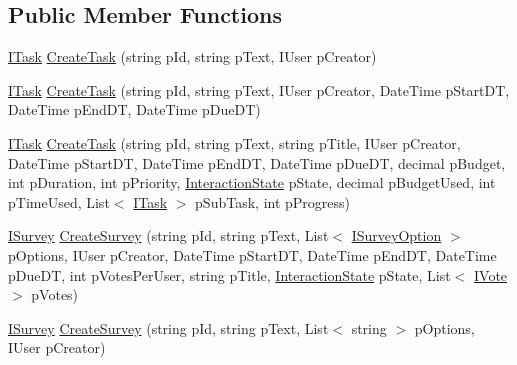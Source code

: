 \subsection*{Public Member Functions}
\begin{DoxyCompactItemize}
\item 
\hyperlink{interface_plex_byte_1_1_mo_cap_1_1_interactions_1_1_i_task}{I\+Task} \hyperlink{interface_plex_byte_1_1_mo_cap_1_1_interactions_1_1_i_interaction_factory_a2652ae146eddd246b136bfd47b55bd10}{Create\+Task} (string p\+Id, string p\+Text, I\+User p\+Creator)
\item 
\hyperlink{interface_plex_byte_1_1_mo_cap_1_1_interactions_1_1_i_task}{I\+Task} \hyperlink{interface_plex_byte_1_1_mo_cap_1_1_interactions_1_1_i_interaction_factory_ad3f030a61f41e66812ba458194a02182}{Create\+Task} (string p\+Id, string p\+Text, I\+User p\+Creator, Date\+Time p\+Start\+DT, Date\+Time p\+End\+DT, Date\+Time p\+Due\+DT)
\item 
\hyperlink{interface_plex_byte_1_1_mo_cap_1_1_interactions_1_1_i_task}{I\+Task} \hyperlink{interface_plex_byte_1_1_mo_cap_1_1_interactions_1_1_i_interaction_factory_a36f7e9ea19a2b58c4d72b7eda9568a6c}{Create\+Task} (string p\+Id, string p\+Text, string p\+Title, I\+User p\+Creator, Date\+Time p\+Start\+DT, Date\+Time p\+End\+DT, Date\+Time p\+Due\+DT, decimal p\+Budget, int p\+Duration, int p\+Priority, \hyperlink{namespace_plex_byte_1_1_mo_cap_1_1_interactions_afcb673d9186608b6bd3b187179aedc8a}{Interaction\+State} p\+State, decimal p\+Budget\+Used, int p\+Time\+Used, List$<$ \hyperlink{interface_plex_byte_1_1_mo_cap_1_1_interactions_1_1_i_task}{I\+Task} $>$ p\+Sub\+Task, int p\+Progress)
\item 
\hyperlink{interface_plex_byte_1_1_mo_cap_1_1_interactions_1_1_i_survey}{I\+Survey} \hyperlink{interface_plex_byte_1_1_mo_cap_1_1_interactions_1_1_i_interaction_factory_a10d691633579fc9ebef747595e09a1c2}{Create\+Survey} (string p\+Id, string p\+Text, List$<$ \hyperlink{interface_plex_byte_1_1_mo_cap_1_1_interactions_1_1_i_survey_option}{I\+Survey\+Option} $>$ p\+Options, I\+User p\+Creator, Date\+Time p\+Start\+DT, Date\+Time p\+End\+DT, Date\+Time p\+Due\+DT, int p\+Votes\+Per\+User, string p\+Title, \hyperlink{namespace_plex_byte_1_1_mo_cap_1_1_interactions_afcb673d9186608b6bd3b187179aedc8a}{Interaction\+State} p\+State, List$<$ \hyperlink{interface_plex_byte_1_1_mo_cap_1_1_interactions_1_1_i_vote}{I\+Vote} $>$ p\+Votes)
\item 
\hyperlink{interface_plex_byte_1_1_mo_cap_1_1_interactions_1_1_i_survey}{I\+Survey} \hyperlink{interface_plex_byte_1_1_mo_cap_1_1_interactions_1_1_i_interaction_factory_a5b5cedeba1e0748c243b7a9a5f2fb5a6}{Create\+Survey} (string p\+Id, string p\+Text, List$<$ string $>$ p\+Options, I\+User p\+Creator)

\end{DoxyCompactItemize}
